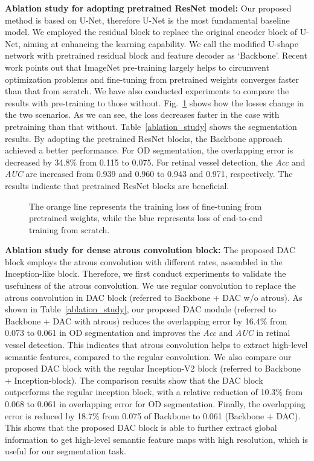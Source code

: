 \documentclass[journal]{IEEEtran}
\begin{document}
\textbf{Ablation study for adopting pretrained ResNet model:} Our proposed method is based on U-Net, therefore U-Net is the most fundamental baseline model. We employed the residual block to replace the original encoder block of U-Net, aiming at enhancing the learning capability. We call the modified U-shape network with pretrained residual block and feature decoder as `Backbone'. Recent work \cite{he2018rethinking} points out that ImageNet pre-training largely helps to circumvent optimization problems and fine-tuning from pretrained
weights converges faster than that from scratch. We have also conducted experiments to compare the results with pre-training to those without. Fig.~\ref{rebuttal-loss} shows how the losses change in the two scenarios. As we can see, the loss decreases faster in the case with pretraining than that without. Table~\ref{ablation_study} shows the  segmentation results. By adopting the pretrained ResNet blocks, the Backbone approach achieved a better   performance. For OD segmentation, the overlapping error is decreased by 34.8\% from 0.115 to 0.075. For retinal vessel detection, the \textit{Acc}  and \textit{AUC} are increased from 0.939 and 0.960 to 0.943 and 0.971, respectively. The results  indicate  that pretrained ResNet blocks are beneficial.
\begin{figure}[h]
	\centering
	\caption{The orange line represents the training loss of fine-tuning from pretrained weights, while the blue represents loss of end-to-end training from scratch.}
	\label{rebuttal-loss}
\end{figure}

\textbf{Ablation study for dense atrous convolution block:} The proposed DAC block employs the atrous convolution with different rates, assembled in the Inception-like block. Therefore, we first conduct experiments to validate the usefulness of the atrous convolution. We use regular convolution to replace the atrous convolution in DAC block (referred to Backbone + DAC w/o atrous). As shown in Table~\ref{ablation_study}, our proposed DAC module (referred to Backbone + DAC with atrous) reduces the overlapping error by 16.4\% from 0.073 to 0.061 in OD segmentation and improves  the \textit{Acc}  and \textit{AUC}  in retinal vessel detection. This indicates that atrous convolution helps to extract high-level semantic features, compared to the regular convolution. We also compare our proposed DAC block with the regular Inception-V2 block (referred to Backbone + Inception-block). The comparison results show that the DAC block outperforms the regular inception block, with a relative reduction of 10.3\% from 0.068 to 0.061 in overlapping error for OD segmentation.
Finally, the overlapping error is reduced by 18.7\% from 0.075 of Backbone to 0.061 (Backbone + DAC). This shows that the proposed DAC block is able to further extract global information to get high-level semantic feature maps with high resolution, which is useful for our segmentation task.  
\end{document}
